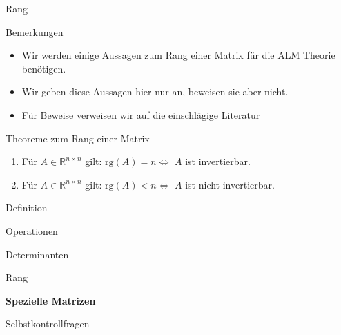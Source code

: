 \documentclass[
  8pt,
  ignorenonframetext,
]{beamer}
\providecommand{\tightlist}{%
  \setlength{\itemsep}{0pt}\setlength{\parskip}{0pt}}
\begin{document}
\begin{frame}{Rang}
\protect\hypertarget{rang-6}{}
\small

Bemerkungen

\begin{itemize}
\tightlist
\item
  Wir werden einige Aussagen zum Rang einer Matrix für die ALM Theorie
  benötigen.
\item
  Wir geben diese Aussagen hier nur an, beweisen sie aber nicht.
\item
  Für Beweise verweisen wir auf die einschlägige Literatur
\end{itemize}

Theoreme zum Rang einer Matrix

\begin{enumerate}
[(1)]
\tightlist
\item
  Für \(A \in \mathbb{R}^{n \times n}\) gilt:
  \(\mbox{rg}(A) = n \Leftrightarrow\) \(A\) ist invertierbar.
\item
  Für \(A \in \mathbb{R}^{n \times n}\) gilt:
  \(\mbox{rg}(A) < n \Leftrightarrow\) \(A\) ist nicht invertierbar.
\end{enumerate}
\end{frame}

\begin{frame}{}
\protect\hypertarget{section-7}{}
\large
{}
\vfill

Definition

Operationen

Determinanten

Rang

\textbf{Spezielle Matrizen}

Selbstkontrollfragen \vfill
\end{frame}
\end{document}
